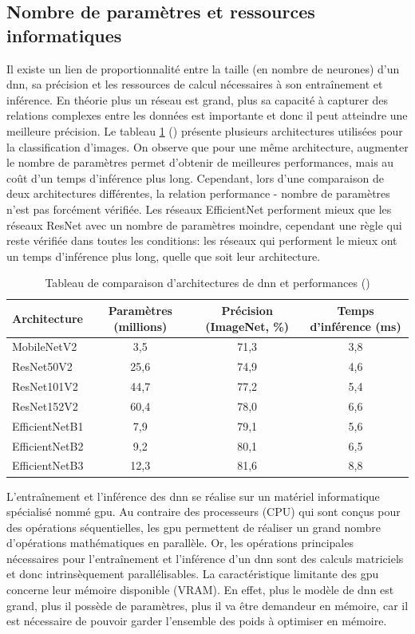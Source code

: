 \subsection{Nombre de paramètres et ressources informatiques}
Il existe un lien de proportionnalité entre la taille (en nombre de neurones) d'un \gls{dnn}, sa précision et les ressources de calcul nécessaires à son entraînement et inférence. En théorie plus un réseau est grand, plus sa capacité à capturer des relations complexes entre les données est importante et donc il peut atteindre une meilleure précision. Le tableau \ref{table:dnn-size} (\cite{chollet_keras_2023}) présente plusieurs architectures utilisées pour la classification d'images. On observe que pour une même architecture, augmenter le nombre de paramètres permet d'obtenir de meilleures performances, mais au coût d'un temps d'inférence plus long. Cependant, lors d'une comparaison de deux architectures différentes, la relation performance - nombre de paramètres n'est pas forcément vérifiée. Les réseaux EfficientNet performent mieux que les réseaux ResNet avec un nombre de paramètres moindre, cependant une règle qui reste vérifiée dans toutes les conditions: les réseaux qui performent le mieux ont un temps d'inférence plus long, quelle que soit leur architecture.

\begin{table}[!ht]
\centering
\begin{tabular}{|l|c|c|c|} 
 \hline
 Architecture & Paramètres (millions) & Précision (ImageNet, \%)  & Temps d'inférence (ms) \\
 \hline
MobileNetV2 & 3,5 & 71,3 & 3,8 \\
\hline
ResNet50V2 & 25,6 & 74,9 & 4,6 \\ 
ResNet101V2 & 44,7 & 77,2 & 5,4 \\ 
ResNet152V2 & 60,4 & 78,0 & 6,6 \\
\hline
EfficientNetB1 & 7,9 & 79,1 & 5,6 \\
EfficientNetB2 & 9,2 & 80,1& 6,5 \\
EfficientNetB3 & 12,3 & 81,6 & 8,8 \\
 \hline
\end{tabular}
\caption{Tableau de comparaison d'architectures de \gls{dnn} et performances (\cite{chollet_keras_2023})}
\label{table:dnn-size}
\end{table}

L'entraînement et l'inférence des \gls{dnn} se réalise sur un matériel informatique spécialisé nommé \gls{gpu}. Au contraire des processeurs (CPU) qui sont conçus pour des opérations séquentielles, les \gls{gpu} permettent de réaliser un grand nombre d'opérations mathématiques en parallèle. Or, les opérations principales nécessaires pour l'entraînement et l'inférence d'un \gls{dnn} sont des calculs matriciels et donc intrinsèquement parallélisables. La caractéristique limitante des \gls{gpu} concerne leur mémoire disponible (VRAM). En effet, plus le modèle de \gls{dnn} est grand, plus il possède de paramètres, plus il va être demandeur en mémoire, car il est nécessaire de pouvoir garder l'ensemble des poids à optimiser en mémoire. 


